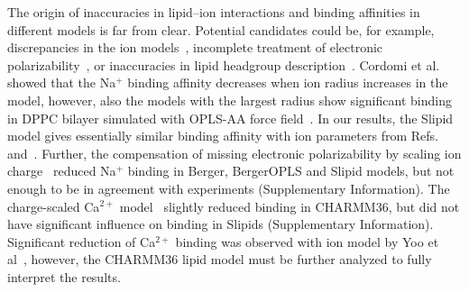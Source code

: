\documentclass[pre,aps,floatfix,authordate1-4,twocolumn]{revtex4-1}
\begin{document}

The origin of inaccuracies in lipid--ion interactions and binding affinities in different models is far from clear.
Potential candidates could be, for example, discrepancies in the ion models~\cite{hess06,chen07,Reif13},
incomplete treatment of electronic polarizability~\cite{leontyev11}, or inaccuracies in lipid headgroup 
description~\cite{botan15}. Cordomi et al.~\cite{cordomi09} showed that the Na$^+$ binding affinity decreases when ion radius increases
in the model, however, also the models with the largest radius show significant binding in DPPC bilayer simulated with
OPLS-AA force field~\cite{jorgensen96}. In our results, the Slipid model gives essentially similar binding affinity with 
ion parameters from Refs.~\cite{smith94} and~\cite{beglov94,roux96}. Further, the compensation of missing electronic 
polarizability by scaling ion charge~\cite{kohagen16,leontyev11} reduced Na$^+$ binding in Berger, 
BergerOPLS and Slipid models, but not enough to be in agreement with experiments (Supplementary Information). 
The charge-scaled Ca$^{2+}$ model~\cite{kohagen14} slightly reduced binding in CHARMM36, but did not have 
significant influence on binding in Slipids (Supplementary Information). Significant reduction of
Ca$^{2+}$ binding was observed with ion model by Yoo et al~\cite{yoo16}, however, the CHARMM36 lipid
model must be further analyzed to fully interpret the results.
\end{document}
